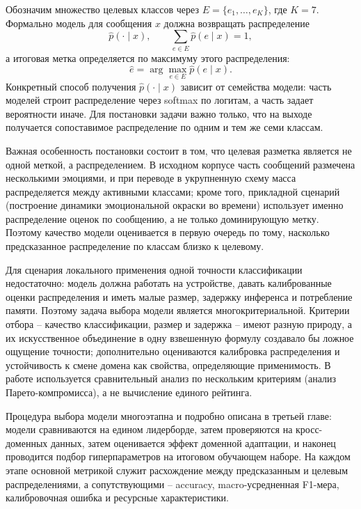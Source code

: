 \documentclass[12pt,a4paper]{report}
\begin{document}
Обозначим множество целевых классов через \(E=\{e_1,\ldots,e_K\}\), где \(K=7\). Формально модель для сообщения \(x\) должна возвращать распределение
\begin{equation}
  \hat p(\cdot\mid x), \qquad \sum_{e\in E}\hat p(e\mid x)=1,
  \label{eq:emotion-classification}
\end{equation}
а итоговая метка определяется по максимуму этого распределения:
\begin{equation}
  \hat e = \arg\max_{e\in E}\hat p(e\mid x).
  \label{eq:emotion-argmax}
\end{equation}
Конкретный способ получения \(\hat p(\cdot\mid x)\) зависит от семейства модели: часть моделей строит распределение через softmax по логитам, а часть задает вероятности иначе. Для постановки задачи важно только, что на выходе получается сопоставимое распределение по одним и тем же семи классам.

Важная особенность постановки состоит в том, что целевая разметка является не одной меткой, а распределением. В исходном корпусе часть сообщений размечена несколькими эмоциями, и при переводе в укрупненную схему масса распределяется между активными классами; кроме того, прикладной сценарий (построение динамики эмоциональной окраски во времени) использует именно распределение оценок по сообщению, а не только доминирующую метку. Поэтому качество модели оценивается в первую очередь по тому, насколько предсказанное распределение по классам близко к целевому.

Для сценария локального применения одной точности классификации недостаточно: модель должна работать на устройстве, давать калиброванные оценки распределения и иметь малые размер, задержку инференса и потребление памяти. Поэтому задача выбора модели является многокритериальной. Критерии отбора -- качество классификации, размер и задержка -- имеют разную природу, а их искусственное объединение в одну взвешенную формулу создавало бы ложное ощущение точности; дополнительно оцениваются калибровка распределения и устойчивость к смене домена как свойства, определяющие применимость. В работе используется сравнительный анализ по нескольким критериям (анализ Парето-компромисса), а не вычисление единого рейтинга.

Процедура выбора модели многоэтапна и подробно описана в третьей главе: модели сравниваются на едином лидерборде, затем проверяются на кросс-доменных данных, затем оценивается эффект доменной адаптации, и наконец проводится подбор гиперпараметров на итоговом обучающем наборе. На каждом этапе основной метрикой служит расхождение между предсказанным и целевым распределениями, а сопутствующими -- accuracy, macro-усредненная F1-мера, калибровочная ошибка и ресурсные характеристики.
\end{document}
